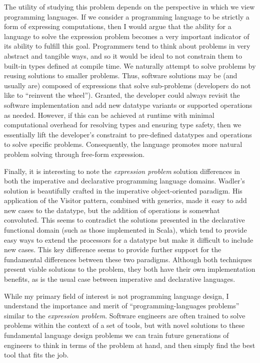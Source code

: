 \documentclass[12pt,letterpaper]{article}
\begin{document}
The utility of studying this problem depends on the perspective in which we view programming languages. 
If we consider a programming language to be strictly a form of expressing computations, then I would 
argue that the ability for a language to solve the expression problem becomes a very important indicator of its ability to fulfill this goal. 
Programmers tend to think about problems in very abstract and tangible ways, and so it would be ideal
to not constrain them to built-in types defined at compile time. We naturally attempt to solve problems
by reusing solutions to smaller problems. Thus, software solutions may be (and usually are) 
composed of expressions that solve sub-problems (developers do not like to ``reinvent the wheel'').
Granted, the developer could always revisit the software implementation and add new
datatype variants or supported operations as needed. However, if this can be achieved at runtime with minimal computational
overhead for resolving types and ensuring type safety, then we essentially lift the developer's 
constraint to pre-defined datatypes and operations to solve specific problems. Consequently, 
the language promotes more natural problem solving through free-form expression. 

Finally, it is interesting to note the \emph{expression problem} solution differences in both the 
imperative and declarative programming language domains.
Wadler's solution is beautifully crafted in the imperative object-oriented paradigm. 
His application of the Visitor pattern, combined with generics, made it easy to add new cases
to the datatype, but the addition of operations is somewhat convoluted. This seems to contradict the 
solutions presented in the declarative functional domain (such as those implemented in Scala), 
which tend to provide easy ways to extend the processors for a datatype but make it difficult to include new cases. 
This key difference seems to provide further support for the fundamental differences between these two paradigms.
Although both techniques present viable solutions to the problem, they both have their own implementation
benefits, as is the usual case between imperative and declarative languages. 

While my primary field of interest is not programming language design, I understand the importance
and merit of ``programming-languages problems'' similar to the \emph{expression problem}. Software engineers
are often trained to solve problems within the context of a set of tools, but with novel solutions
to these fundamental language design problems we can train future generations of engineers to
think in terms of the problem at hand, and then simply find the best tool that fits the job. 



\end{document}
